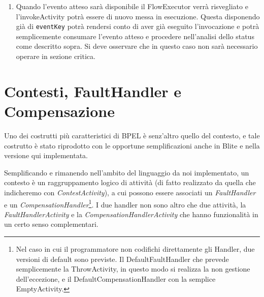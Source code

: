 \begin{enumerate}
  \item Quando l'evento atteso sarà disponibile il FlowExecutor verrà
  risvegliato e l'invokeActivity potrà essere di nuovo messa in esecuzione.
  Questa disponendo già di \texttt{eventKey} potrà rendersi conto di aver
  già eseguito l'invocazione e potrà semplicemente consumare l'evento
  atteso e procedere nell'analisi dello status come descritto sopra. Si deve
  osservare che in questo caso non sarà necessario operare in sezione critica.
\end{enumerate}

\section{Contesti, FaultHandler e Compensazione}

Uno dei costrutti più caratteristici di BPEL \`e senz'altro quello del
contesto, e tale costrutto \`e stato riprodotto con le opportune
semplificazioni anche in Blite e nella versione qui implementata.

Semplificando e rimanendo nell'ambito del linguaggio da noi implementato, un
contesto \`e un raggruppamento logico di attività (di fatto realizzato da
quella che indicheremo con \emph{ContestActivity}), a cui possono essere
associati un \emph{FaultHandler} e un \emph{CompensationHandler}\footnote{Nel
caso in cui il programmatore non codifichi direttamente gli Handler, due
versioni di default sono previste. Il DefaultFaultHandler che prevede
semplicemente la ThrowActivity, in questo modo si realizza la non gestione
dell'eccezione, e il DefaultCompensationHandler con la semplice
EmptyActivity.}. I due handler non sono altro che due attività, la \emph{FaultHandlerActivity} e la \emph{CompensationHandlerActivity} che hanno funzionalità in un certo senso complementari.

